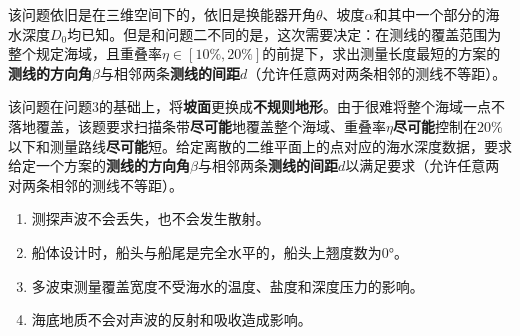 该问题依旧是在三维空间下的，依旧是换能器开角$\theta$、坡度$\alpha$和其中一个部分的海水深度$D_0$均已知。但是和问题二不同的是，这次需要决定：在测线的覆盖范围为整个规定海域，且重叠率$\eta \in [10\%, 20\%]$的前提下，求出测量长度最短的方案的\textbf{测线的方向角}$\beta$与相邻两条\textbf{测线的间距}$d$（允许任意两对两条相邻的测线不等距）。


该问题在问题3的基础上，将\textbf{坡面}更换成\textbf{不规则地形}。由于很难将整个海域一点不落地覆盖，该题要求扫描条带\textbf{尽可能}地覆盖整个海域、重叠率$\eta$\textbf{尽可能}控制在$20\%$以下和测量路线\textbf{尽可能}短。给定离散的二维平面上的点对应的海水深度数据，要求给定一个方案的\textbf{测线的方向角}$\beta$与相邻两条\textbf{测线的间距}$d$以满足要求（允许任意两对两条相邻的测线不等距）。



\quad\newline
{}

\begin{enumerate}
    \item 测探声波不会丢失，也不会发生散射。
    \item 船体设计时，船头与船尾是完全水平的，船头上翘度数为0°。
    \item 多波束测量覆盖宽度不受海水的温度、盐度和深度压力的影响。
    \item 海底地质不会对声波的反射和吸收造成影响。
\end{enumerate}


\quad\newline
{}



